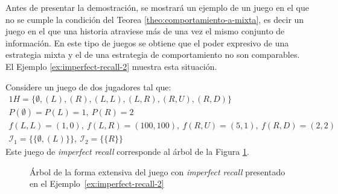 Antes de presentar la demostración, se mostrará un ejemplo de un juego en el que no se cumple la condición del Teorea \ref{theo:comportamiento-a-mixta}, es decir un juego en el que una historia atraviese más de una vez el mismo conjunto de información. En este tipo de juegos se obtiene que el poder expresivo de una estrategia mixta y el de una estrategia de comportamiento no son comparables. El Ejemplo \ref{ex:imperfect-recall-2} \cite[p.~44]{bib:handbook-blai} muestra esta situación.

\begin{example}
\label{ex:imperfect-recall-2}
Considere un juego de dos jugadores tal que:
\begin{alignat}{1}
H = \{ \emptyset, (L), (R), (L,L), (L,R), (R, U), (R, D)\} \\
 P(\emptyset) = P(L) = 1, \ P(R) = 2 \\
 f(L, L) = (1, 0), \ f(L, R) = (100, 100), \ f(R, U) = (5, 1), \ f(R, D) = (2, 2) \\
\mathcal{I}_1 = \{ \{ \emptyset, (L)\} \}, \ \mathcal{I}_2 = \{ \{ R \} \}
\end{alignat}
Este juego de \textit{imperfect
recall} corresponde al árbol de la Figura \ref{fig:imperfect-recall-2}.
\end{example}

\begin{figure}[ht]
\begin{center}
\caption{Árbol de la forma extensiva del juego con \textit{imperfect recall} presentado en el Ejemplo~\ref{ex:imperfect-recall-2}}
\label{fig:imperfect-recall-2}
\end{center}
\end{figure}

